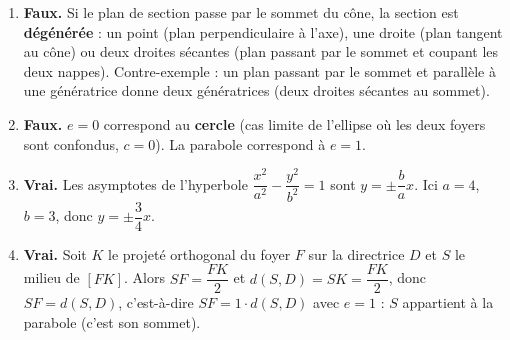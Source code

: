 \documentclass[11pt]{article}
\newcommand{\cle}[1]{{\popxbold\color{popdark}#1}}
\begin{document}
\begin{corrige}
\begin{enumerate}
\item \textbf{Faux.} Si le plan de section passe par le sommet du cône, la section est \textbf{dégénérée} : un point (plan perpendiculaire à l'axe), une droite (plan tangent au cône) ou deux droites sécantes (plan passant par le sommet et coupant les deux nappes). Contre-exemple : un plan passant par le sommet et parallèle à une génératrice donne deux génératrices (deux droites sécantes au sommet).
\item \textbf{Faux.} $e = 0$ correspond au \textbf{cercle} (cas limite de l'ellipse où les deux foyers sont confondus, $c=0$). La parabole correspond à $e = 1$.
\item \textbf{Vrai.} Les asymptotes de l'hyperbole $\dfrac{x^{2}}{a^{2}} - \dfrac{y^{2}}{b^{2}} = 1$ sont $y = \pm \dfrac{b}{a}x$. Ici $a=4$, $b=3$, donc $y = \pm \dfrac{3}{4}x$.
\item \textbf{Vrai.} Soit $K$ le projeté orthogonal du foyer $F$ sur la directrice $D$ et $S$ le milieu de $[FK]$. Alors $SF = \dfrac{FK}{2}$ et $d(S, D) = SK = \dfrac{FK}{2}$, donc $SF = d(S, D)$, c'est-à-dire $SF = 1 \cdot d(S, D)$ avec $e = 1$ : $S$ appartient à la parabole (c'est son \cle{sommet}).
\end{enumerate}
\end{corrige}
\end{document}
